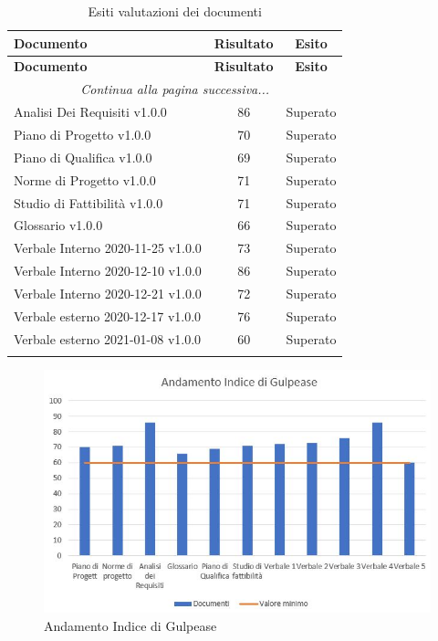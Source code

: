 \documentclass[../piano_di_qualifica.tex]{subfiles}
\begin{document}
\begin{center}
	\begin{longtable}{|l|c|c|}
		\hline
		\rowcolor{lightgray}
		\textbf{Documento}                 & \textbf{Risultato} & \textbf{Esito} \\
		\hline
		\endfirsthead
	
		\hline
		\rowcolor{lightgray}
		\textbf{Documento}                 & \textbf{Risultato} & \textbf{Esito} \\
		\hline
		\endhead
		
		\hline
		\multicolumn{3}{|c|}{\emph{Continua alla pagina successiva...}}\\
		\hline
		\endfoot

		\endlastfoot

		Analisi Dei Requisiti v1.0.0       & 86                 & Superato       \\
		Piano di Progetto v1.0.0           & 70                 & Superato       \\
		Piano di Qualifica v1.0.0          & 69                 & Superato       \\
		Norme di Progetto v1.0.0           & 71                 & Superato       \\
		Studio di Fattibilità v1.0.0       & 71                 & Superato       \\
		Glossario v1.0.0                   & 66                 & Superato       \\
		Verbale Interno 2020-11-25 v1.0.0  & 73                 & Superato       \\
		Verbale Interno 2020-12-10 v1.0.0  & 86                 & Superato       \\
		Verbale Interno 2020-12-21 v1.0.0  & 72                 & Superato       \\
		Verbale esterno 2020-12-17  v1.0.0 & 76                 & Superato       \\
		Verbale esterno 2021-01-08  v1.0.0 & 60                 & Superato       \\
		\hline
		\caption{Esiti valutazioni dei documenti}
	\end{longtable}
\end{center}

\begin{figure}[H]
	\centering
	\includegraphics[width=12cm]{img/media_gul.jpg}
	\caption{ Andamento Indice di Gulpease}
\end{figure}
\end{document}
